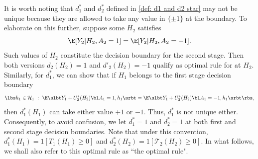 \documentclass[preprint] {imsart}
\begin{document}
\begin{remark}
\label{remark: uniqueness of d1star and d2star}
It is worth noting that $d_1^*$ and $d_2^*$ defined in \eqref{def: d1 and d2 star} may not be unique because they are allowed to take any value in $\{\pm 1\}$ at the boundary. To elaborate on this further, suppose some $H_2$ satisfies
\[\E[Y_2| H_2,A_2=1]=\E[Y_2| H_2,A_2=-1].\]
Such values of $H_2$ constitute the decision boundary for the second stage.
Then both versions $d_2(H_2)=1$ and $d'_2(H_2)=-1$ qualify as  optimal rule for at  $H_2$. Similarly, for $d_1^*$, we can show that if $H_1$ belongs to the first stage decision boundary
\[\lbs h_1\in\mathcal H_1\ :\ \E\slbt Y_1+U_2^*( H_2)\bl A_1=1,h_1\srbt=\E\slbt Y_1+U_2^*( H_2)\bl A_1=-1,h_1\srbt\rbs,\]
then $d_1^*(H_1)$ can take either value $+1$ or $-1$. Thus, $d_1^*$ is not unique either.
Consequently, to avoid confusion, we let $d_1^*=1$ and $d_2^*=1$ at both first and second stage decision boundaries. Note that under this convention, $d_1^*(H_1)=1[T_1(H_1)\geq 0]$ and $d_2^*(H_2)=1[\mathcal T_2(H_2)\geq 0]$. In what follows, we  shall also refer to this optimal rule as ``the optimal rule".
\hfill\qedsymbol{}
\end{remark}
\end{document}
